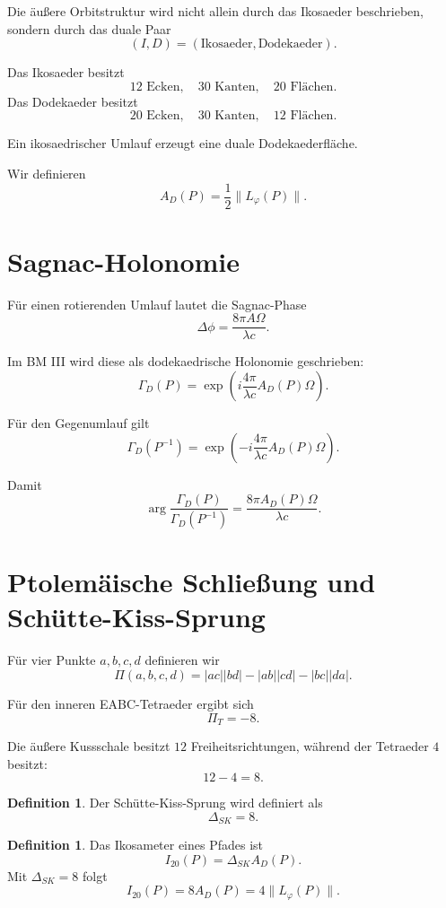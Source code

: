 \documentclass[11pt,a4paper]{article}
\theoremstyle{definition}
\newtheorem{definition}[satz]{Definition}
\begin{document}
	Die äußere Orbitstruktur wird nicht allein durch das Ikosaeder beschrieben, sondern durch das duale Paar
	\[
	(I,D)=(\text{Ikosaeder},\text{Dodekaeder}).
	\]
	
	Das Ikosaeder besitzt
	\[
	12\text{ Ecken},\quad30\text{ Kanten},\quad20\text{ Flächen}.
	\]
	Das Dodekaeder besitzt
	\[
	20\text{ Ecken},\quad30\text{ Kanten},\quad12\text{ Flächen}.
	\]
	
	Ein ikosaedrischer Umlauf erzeugt eine duale Dodekaederfläche.
	
	Wir definieren
	\[
	A_D(P)=\frac12\|L_\varphi(P)\|.
	\]
	
	\section{Sagnac-Holonomie}
	
	Für einen rotierenden Umlauf lautet die Sagnac-Phase
	\[
	\Delta\phi=\frac{8\pi A\Omega}{\lambda c}.
	\]
	
	Im BM III wird diese als dodekaedrische Holonomie geschrieben:
	\[
	\Gamma_D(P)=
	\exp\left(
	i\frac{4\pi}{\lambda c}A_D(P)\Omega
	\right).
	\]
	
	Für den Gegenumlauf gilt
	\[
	\Gamma_D(P^{-1})=
	\exp\left(
	-i\frac{4\pi}{\lambda c}A_D(P)\Omega
	\right).
	\]
	
	Damit
	\[
	\arg\frac{\Gamma_D(P)}{\Gamma_D(P^{-1})}
	=
	\frac{8\pi A_D(P)\Omega}{\lambda c}.
	\]
	
	\section{Ptolemäische Schließung und Schütte-Kiss-Sprung}
	
	Für vier Punkte \(a,b,c,d\) definieren wir
	\[
	\Pi(a,b,c,d)=|ac||bd|-|ab||cd|-|bc||da|.
	\]
	
	Für den inneren EABC-Tetraeder ergibt sich
	\[
	\Pi_T=-8.
	\]
	
	Die äußere Kussschale besitzt \(12\) Freiheitsrichtungen, während der Tetraeder \(4\) besitzt:
	\[
	12-4=8.
	\]
	
	\begin{definition}
		Der Schütte-Kiss-Sprung wird definiert als
		\[
		\Delta_{SK}=8.
		\]
	\end{definition}
	
	\begin{definition}
		Das Ikosameter eines Pfades ist
		\[
		I_{20}(P)=\Delta_{SK}A_D(P).
		\]
		Mit \(\Delta_{SK}=8\) folgt
		\[
		I_{20}(P)=8A_D(P)=4\|L_\varphi(P)\|.
		\]
	\end{definition}
	
\end{document}
